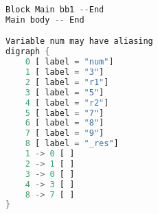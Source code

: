 \begin{minipage}[c][10cm][c]{0,5\textwidth}
\begin{lstlisting}[language=Rust]
Block Main bb1 --End
Main body -- End

Variable num may have aliasing
digraph {
    0 [ label = "num"]
    1 [ label = "3"]
    2 [ label = "r1"]
    3 [ label = "5"]
    4 [ label = "r2"]
    5 [ label = "7"]
    6 [ label = "8"]
    7 [ label = "9"]
    8 [ label = "_res"]
    1 -> 0 [ ]
    2 -> 1 [ ]
    3 -> 0 [ ]
    4 -> 3 [ ]
    8 -> 7 [ ]
}
\end{lstlisting}
\end{minipage}
\begin{minipage}[c][9cm][t]{0,5\textwidth}
\begin{center}
\end{center}
\end{minipage}
